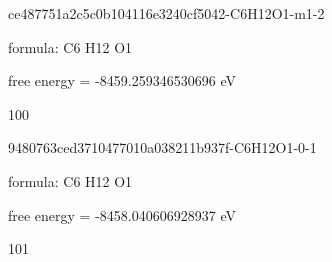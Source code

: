 \documentclass{article}
\begin{document}
\vspace{1cm}


ce487751a2c5c0b104116e3240cf5042-C6H12O1-m1-2



formula: C6 H12 O1



free energy = -8459.259346530696 eV

100

\vspace{1cm}


9480763ced3710477010a038211b937f-C6H12O1-0-1



formula: C6 H12 O1



free energy = -8458.040606928937 eV

101
\end{document}
